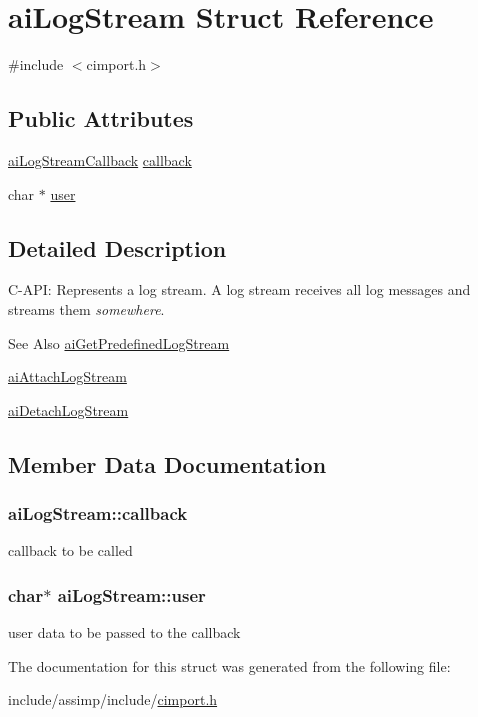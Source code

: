 \hypertarget{structai_log_stream}{\section{ai\-Log\-Stream Struct Reference}
\label{structai_log_stream}
}


{\ttfamily \#include $<$cimport.\-h$>$}

\subsection*{Public Attributes}
\begin{DoxyCompactItemize}
\item 
\hyperlink{cimport_8h_a8fd7aab231c7632030590290ca4f57d8}{ai\-Log\-Stream\-Callback} \hyperlink{structai_log_stream_ac73ae46eee54ba0f920d6abb97c33e97}{callback}
\item 
char $\ast$ \hyperlink{structai_log_stream_a3382042e4171a6dd5a71d7f98741f86e}{user}
\end{DoxyCompactItemize}


\subsection{Detailed Description}
C-\/\-A\-P\-I\-: Represents a log stream. A log stream receives all log messages and streams them {\itshape somewhere}. \begin{DoxySeeAlso}{See Also}
\hyperlink{cimport_8h_ad7e375d7b134ec590e812ad1f50eab94}{ai\-Get\-Predefined\-Log\-Stream} 

\hyperlink{cimport_8h_a75c5aa6027cb059e63b3dda005c9c149}{ai\-Attach\-Log\-Stream} 

\hyperlink{cimport_8h_a98ad05bb95e8f8157a97c133812a1597}{ai\-Detach\-Log\-Stream} 
\end{DoxySeeAlso}


\subsection{Member Data Documentation}
\hypertarget{structai_log_stream_ac73ae46eee54ba0f920d6abb97c33e97}{
\subsubsection[{callback}]{ ai\-Log\-Stream\-::callback}}\label{structai_log_stream_ac73ae46eee54ba0f920d6abb97c33e97}
callback to be called \hypertarget{structai_log_stream_a3382042e4171a6dd5a71d7f98741f86e}{
\subsubsection[{user}]{\setlength{\rightskip}{0pt plus 5cm}char$\ast$ ai\-Log\-Stream\-::user}}\label{structai_log_stream_a3382042e4171a6dd5a71d7f98741f86e}
user data to be passed to the callback 

The documentation for this struct was generated from the following file\-:\begin{DoxyCompactItemize}
\item 
include/assimp/include/\hyperlink{cimport_8h}{cimport.\-h}\end{DoxyCompactItemize}
